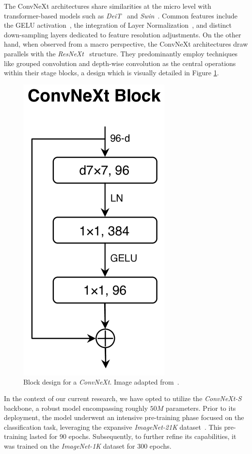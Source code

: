 The ConvNeXt architectures share similarities at the micro level with transformer-based models such as \textit{DeiT}~\cite{touvron2021training} and \textit{Swin}~\cite{liu2021swin}. Common features include the GELU activation~\cite{hendrycks2023gaussian}, the integration of Layer Normalization~\cite{ba2016layer}, and distinct down-sampling layers dedicated to feature resolution adjustments. On the other hand, when observed from a macro perspective, the ConvNeXt architectures draw parallels with the \textit{ResNeXt}~\cite{8100117} structure. They predominantly employ techniques like grouped convolution and depth-wise convolution as the central operations within their stage blocks, a design which is visually detailed in Figure \ref{fig:convnext-block}.\\

\begin{figure}[htb]
    \centering
    \includegraphics[width=0.25\linewidth]{figures/chapters-imgs/30/convnext-block.png}
    \caption{Block design for a \textit{ConvNeXt}. Image adapted from~\cite{wang2023internimage}.}
    \label{fig:convnext-block}
\end{figure}

In the context of our current research, we have opted to utilize the \textit{ConvNeXt-S} backbone, a robust model encompassing roughly $50M$ parameters. Prior to its deployment, the model underwent an intensive pre-training phase focused on the classification task, leveraging the expansive \textit{ImageNet-21K} dataset~\cite{5206848}. This pre-training lasted for 90 epochs. Subsequently, to further refine its capabilities, it was trained on the \textit{ImageNet-1K} dataset for 300 epochs.


